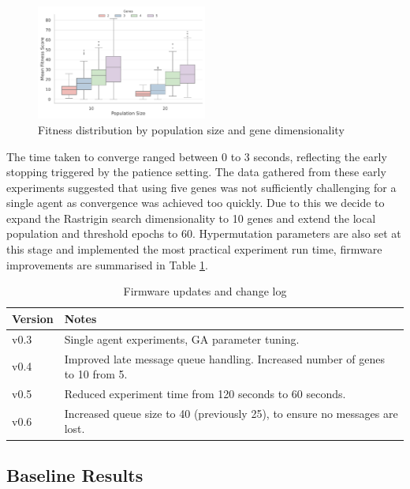 \documentclass[conference]{IEEEtran}
\begin{document}
\begin{figure}[h]
    \centering
    \includegraphics[width=0.50\textwidth]{ga_prelim_analysis_v2.pdf}
    \caption{Fitness distribution by population size and gene dimensionality}
    \label{fig:ga_prelim_analysis}
\end{figure}

The time taken to converge ranged between 0 to 3 seconds, reflecting the early stopping triggered by the patience setting. The data gathered from these early experiments suggested that using five genes was not sufficiently challenging for a single agent as convergence was achieved too quickly. Due to this we decide to expand the Rastrigin search dimensionality to 10 genes and extend the local population and threshold epochs to 60. Hypermutation parameters are also set at this stage and implemented the most practical experiment run time, firmware improvements are summarised in Table \ref{tab:firmware_versions}.

\begin{table}[H]
\centering
\caption{Firmware updates and change log}
\begin{tabular}{@{} l p{7.5cm} @{}} 
\toprule
\textbf{Version} & \textbf{Notes} \\
\midrule
v0.3 & Single agent experiments, GA parameter tuning. \\
v0.4 & Improved late message queue handling. Increased number of genes to 10 from 5.\\
v0.5 & Reduced experiment time from 120 seconds to 60 seconds. \\
v0.6 & Increased queue size to 40 (previously 25), to ensure no messages are lost.\\
\bottomrule
\end{tabular}
\label{tab:firmware_versions}
\end{table}

\subsection{Baseline Results}
\end{document}
